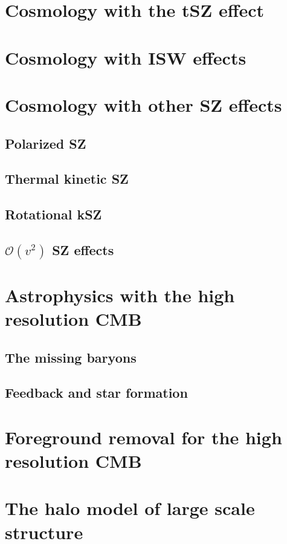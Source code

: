 \documentclass[aps,nofootinbib,groupedaddress]{revtex4}
\begin{document}
\section{Cosmology with the tSZ effect}

\section{Cosmology with ISW effects}

\section{Cosmology with other SZ effects}

\subsection{Polarized SZ}

\subsection{Thermal kinetic SZ}

\subsection{Rotational kSZ}

\subsection{$\mathcal{O}(v^2)$ SZ effects}

\section{Astrophysics with the high resolution CMB}

\subsection{The missing baryons}

\subsection{Feedback and star formation}

\section{Foreground removal for the high resolution CMB}




\appendix

\section{The halo model of large scale structure}
\end{document}
